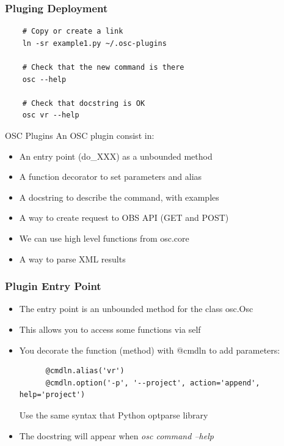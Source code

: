 \documentclass{beamer}
\begin{document}
\begin{frame}[fragile]
  \frametitle{Pluging Deployment}
  \lstset{style=mypython}
  \begin{lstlisting}
    # Copy or create a link
    ln -sr example1.py ~/.osc-plugins

    # Check that the new command is there
    osc --help

    # Check that docstring is OK
    osc vr --help
  \end{lstlisting}
\end{frame}

\begin{frame}{OSC Plugins}
  An OSC plugin consist in:
  \begin{itemize}
  \item An entry point (do\_XXX) as a unbounded method
  \item A function decorator to set parameters and alias
  \item A docstring to describe the command, with examples
  \item A way to create request to OBS API (GET and POST)
  \item We can use high level functions from osc.core
  \item A way to parse XML results
  \end{itemize}
\end{frame}

\begin{frame}[fragile]
  \frametitle{Plugin Entry Point}
  \begin{itemize}
  \item The entry point is an unbounded method for the class osc.Osc
  \item This allows you to access some functions via self
  \item You decorate the function (method) with @cmdln to add parameters:
    \lstset{style=mypython}
    \begin{lstlisting}
      @cmdln.alias('vr')
      @cmdln.option('-p', '--project', action='append', help='project')
    \end{lstlisting}
    Use the same syntax that Python optparse library
  \item The docstring will appear when {\em osc command --help}
  \end{itemize}
\end{frame}
\end{document}
